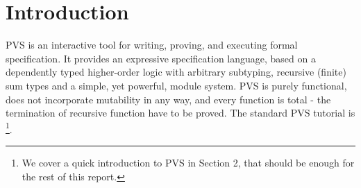 \documentclass[utf8,a4paper]{article}
\begin{document}
\newpage{}

\section{Introduction}

PVS is an interactive tool for writing, proving, and executing formal
specification. It provides an expressive specification language, based
on a dependently typed higher-order logic with arbitrary subtyping,
recursive (finite) sum types and a simple, yet powerful, module
system. PVS is purely functional, does not incorporate mutability in
any way, and every function is total - the termination of recursive
function have to be proved. The standard PVS tutorial is
\cite{WIFT-Tut}\footnote{We cover a quick introduction to PVS in
  Section 2, that should be enough for the rest of this report.}.
\end{document}
